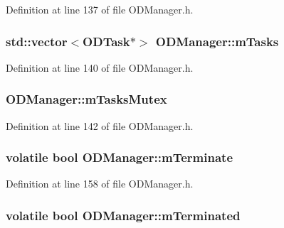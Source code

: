 Definition at line 137 of file O\+D\+Manager.\+h.

\subsubsection[{\texorpdfstring{m\+Tasks}{mTasks}}]{\setlength{\rightskip}{0pt plus 5cm}std\+::vector$<${\bf O\+D\+Task}$\ast$$>$ O\+D\+Manager\+::m\+Tasks\hspace{0.3cm}{\ttfamily [protected]}}\hypertarget{class_o_d_manager_ae8285de40c66dd8dd1ef3d9f9f2f69ae}{}\label{class_o_d_manager_ae8285de40c66dd8dd1ef3d9f9f2f69ae}


Definition at line 140 of file O\+D\+Manager.\+h.

\subsubsection[{\texorpdfstring{m\+Tasks\+Mutex}{mTasksMutex}}]{ O\+D\+Manager\+::m\+Tasks\+Mutex\hspace{0.3cm}{\ttfamily [protected]}}\hypertarget{class_o_d_manager_a9d307a10f6c2f48655c84ecc21b94ac2}{}\label{class_o_d_manager_a9d307a10f6c2f48655c84ecc21b94ac2}


Definition at line 142 of file O\+D\+Manager.\+h.

\subsubsection[{\texorpdfstring{m\+Terminate}{mTerminate}}]{\setlength{\rightskip}{0pt plus 5cm}volatile {\bf bool} O\+D\+Manager\+::m\+Terminate\hspace{0.3cm}{\ttfamily [protected]}}\hypertarget{class_o_d_manager_affc1004f5826b83f3bfd258f59b31f02}{}\label{class_o_d_manager_affc1004f5826b83f3bfd258f59b31f02}


Definition at line 158 of file O\+D\+Manager.\+h.

\subsubsection[{\texorpdfstring{m\+Terminated}{mTerminated}}]{\setlength{\rightskip}{0pt plus 5cm}volatile {\bf bool} O\+D\+Manager\+::m\+Terminated\hspace{0.3cm}{\ttfamily [protected]}}\hypertarget{class_o_d_manager_af90ef020c68adcd0c9f9e0b7bcf799bb}{}\label{class_o_d_manager_af90ef020c68adcd0c9f9e0b7bcf799bb}


